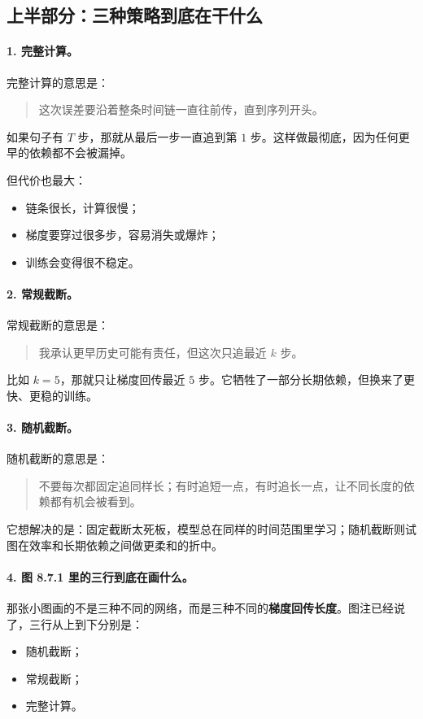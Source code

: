 \documentclass[12pt,a4paper]{ctexart}
\begin{document}
\subsection{上半部分：三种策略到底在干什么}

\paragraph{1. 完整计算。}
完整计算的意思是：
\begin{quote}
这次误差要沿着整条时间链一直往前传，直到序列开头。
\end{quote}

如果句子有 \(T\) 步，那就从最后一步一直追到第 \(1\) 步。这样做最彻底，因为任何更早的依赖都不会被漏掉。

但代价也最大：
\begin{itemize}
  \item 链条很长，计算很慢；
  \item 梯度要穿过很多步，容易消失或爆炸；
  \item 训练会变得很不稳定。
\end{itemize}

\paragraph{2. 常规截断。}
常规截断的意思是：
\begin{quote}
我承认更早历史可能有责任，但这次只追最近 \(k\) 步。
\end{quote}

比如 \(k=5\)，那就只让梯度回传最近 \(5\) 步。它牺牲了一部分长期依赖，但换来了更快、更稳的训练。

\paragraph{3. 随机截断。}
随机截断的意思是：
\begin{quote}
不要每次都固定追同样长；有时追短一点，有时追长一点，让不同长度的依赖都有机会被看到。
\end{quote}

它想解决的是：固定截断太死板，模型总在同样的时间范围里学习；随机截断则试图在效率和长期依赖之间做更柔和的折中。

\paragraph{4. 图 8.7.1 里的三行到底在画什么。}
那张小图画的不是三种不同的网络，而是三种不同的\textbf{梯度回传长度}。图注已经说了，三行从上到下分别是：
\begin{itemize}
  \item 随机截断；
  \item 常规截断；
  \item 完整计算。
\end{itemize}
\end{document}
